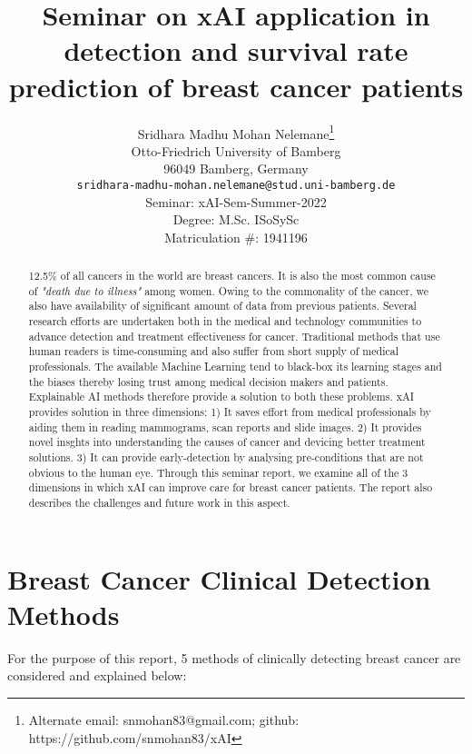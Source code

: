 \documentclass[sigconf, language=english]{acmart}
\title{Seminar on xAI application in detection and survival rate prediction of breast cancer patients}
\author{%
  Sridhara Madhu Mohan Nelemane\thanks{Alternate email: snmohan83@gmail.com; github: https://github.com/snmohan83/xAI} \\
  Otto-Friedrich University of Bamberg\\
  96049 Bamberg, Germany\\
  \texttt{sridhara-madhu-mohan.nelemane@stud.uni-bamberg.de} \\[0.5cm]
  Seminar: xAI-Sem-Summer-2022 \\
  Degree: M.Sc. ISoSySc \\
  Matriculation \#: 1941196
}
\begin{document}
\maketitle
\def\va{{\bm{a}}}

\begin{abstract}
  12.5\% of all cancers in the world are breast cancers. It is also the most common cause of \textit{"death due to illness"} among women. Owing to the commonality of the cancer, we also have availability of significant amount of data from previous patients. Several research efforts are undertaken both in the medical and technology communities to advance detection and treatment effectiveness for cancer. Traditional methods that use human readers is time-consuming and also suffer from short supply of medical professionals. The available Machine Learning tend to black-box its learning stages and the biases thereby losing trust among medical decision makers and patients. Explainable AI methods therefore provide a solution to both these problems. xAI provides solution in three dimensions: 1) It saves effort from medical professionals by aiding them in reading mammograms, scan reports and slide images. 2) It provides novel insghts into understanding the causes of cancer and devicing better treatment solutions. 3) It can provide early-detection by analysing pre-conditions that are not obvious to the human eye. Through this seminar report, we examine all of the 3 dimensions in which xAI can improve care for breast cancer patients. The report also describes the challenges and future work in this aspect.
\end{abstract}


\section{Breast Cancer Clinical Detection Methods}

For the purpose of this report, 5 methods of clinically detecting breast cancer are considered and explained below:
\end{document}
